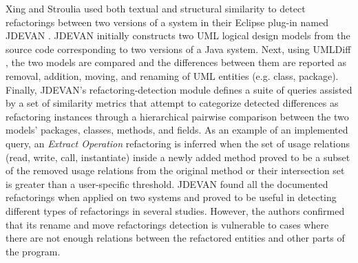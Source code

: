 \documentclass[letterpaper,12pt,onecolumn,final]{report}
\begin{document}
Xing and Stroulia \cite{Xing2006} used both textual and structural similarity to detect refactorings between two versions of a system in their Eclipse plug-in named JDEVAN \cite{Xing2007} \cite{Xing2008}. JDEVAN initially constructs two UML logical design models from the source code corresponding to two versions of a Java system.  Next, using UMLDiff \cite{Xing2005}, the two models are compared and the differences between them are reported as removal, addition, moving, and renaming of UML entities (e.g. class, package). Finally, JDEVAN’s refactoring-detection module defines a suite of queries \cite{Xing2006} assisted by a set of similarity metrics that attempt to categorize detected differences as refactoring instances through a hierarchical pairwise comparison between the two models' packages, classes, methods, and fields. As an example of an implemented query, an \textit{Extract Operation} refactoring is inferred when the set of usage relations (read, write, call, instantiate) inside a newly added method proved to be a subset of the removed usage relations from the original method or their intersection set is greater than a user-specific threshold.  JDEVAN found all the documented refactorings when applied on two systems and proved to be useful in detecting different types of refactorings in several studies. However, the authors confirmed that its rename and move refactorings detection is vulnerable to cases where there are not enough relations between the refactored entities and other parts of the program.
\end{document}
